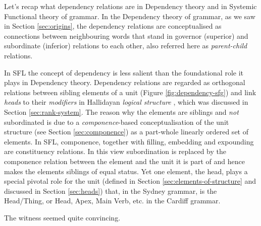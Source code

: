 
    Let's recap what dependency relations are in Dependency theory and in Systemic Functional theory of grammar. In the Dependency theory of grammar, as we saw in Section \ref{sec:origins}, the dependency relations are conceptualised as connections between neighbouring words that stand in governor (superior) and subordinate (inferior) relations to each other, also referred here as \textit{parent-child} relations. 

    In SFL the concept of dependency is less salient than the foundational role it plays in Dependency theory. Dependency relations are regarded as orthogonal relations between sibling elements of a unit (Figure \ref{fig:dependency-sfg}) and link \textit{heads} to their \textit{modifiers} in Hallidayan \textit{logical structure} \citep[388]{Halliday2013}, which was discussed in Section \ref{sec:rank-system}. The reason why the elements are siblings and \textit{not} subordinated is due to a \textit{componence}-based conceptualisation of the unit structure (see Section \ref{sec:componence}) as a part-whole linearly ordered set of elements. In SFL, componence, together with filling, embedding and expounding are constituency relations. In this view subordination is replaced by the componence relation between the element and the unit it is part of and hence makes the elements siblings of equal status. Yet one element, the head, plays a special pivotal role for the unit (defined in Section \ref{sec:elements-of-structure} and discussed in Section \ref{sec:heads}) that, in the Sydney grammar, is the Head/Thing, or Head, Apex, Main Verb, etc. in the Cardiff grammar.


    \begin{exe}
        \ex\label{ex:witness} The witness seemed quite convincing. 
    \end{exe}

